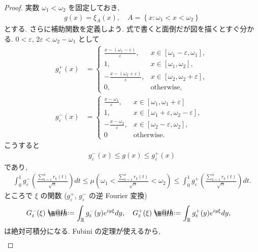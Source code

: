 \documentclass[openany, a4paper, oneside]{book}
\makeatletter
\newcommand*{\defeq}{\mathrel{\rlap{%
\raisebox{0.3ex}{$\m@th\cdot$}}%
\raisebox{-0.3ex}{$\m@th\cdot$}}%
=}
\theoremstyle{break}
\theoremstyle{breakdefn}
\newcommand{\rbk}[1]{\left (#1\right)}
\newcommand{\sqbk}[1]{\left[#1\right]}
\newcommand{\set}[2]{\left\{#1 : #2\right\}}
\newcommand{\bbR}{\mathbb{R}}
\newcommand{\gvarepsilonminus}{g_{\varepsilon}^{-}}
\newcommand{\gvarepsilonplus}{g_{\varepsilon}^{+}}
\makeatother
\begin{document}
\begin{proof}
実数 $\omega_1 < \omega_2$ を固定しておき,
\begin{align}
 g (x)
 =
 \xi_{A} (x), \quad A = \set{x}{\omega_1 < x < \omega_2}
\end{align}
とする.
さらに補助関数を定義しよう.
式で書くと面倒だが図を描くとすぐ分かる.
$0 < \varepsilon$, $2 \varepsilon < \omega_2 - \omega_1$ として
\begin{align}
 g_{\varepsilon}^{+}(x)
 &=
 \begin{cases}
  \frac{x - \rbk{\omega_1 - \varepsilon}}{\varepsilon}, & x \in \sqbk{\omega_1 - \varepsilon, \omega_1}, \\
  1, & x \in \sqbk{\omega_1, \omega_2}, \\
  -\frac{x - \rbk{\omega_2 + \varepsilon}}{\varepsilon}, & x \in \sqbk{\omega_2, \omega_2 + \varepsilon}, \\
  0, & \text{otherwise},
 \end{cases} \\
 g_{\varepsilon}^{-}(x)
 &=
 \begin{cases}
  \frac{x - \omega_1}{\varepsilon}, & x \in \sqbk{\omega_1, \omega_1 + \varepsilon} \\
  1, & x \in \sqbk{\omega_1 + \varepsilon, \omega_2 - \varepsilon}, \\
  -\frac{x - \omega_2}{\varepsilon}, & x \in \sqbk{\omega_2 - \varepsilon, \omega_2}, \\
  0 & \text{otherwise}.
 \end{cases}
\end{align}
こうすると
\begin{align}
 g_{\varepsilon}^{-} (x) \leq g (x) \leq g_{\varepsilon}^{+}(x)
\end{align}
であり,
\begin{align}
 \int_0^1 g_{\varepsilon}^{-} \rbk{\frac{\sum_{k=1}^{n} r_k (t)}{\sqrt{n}}} dt
 \leq
 \mu \rbk{\omega_1 < \frac{\sum_{k=1}^{n} r_k (t)}{\sqrt{n}} < \omega_2}
 \leq
 \int_0^1 g_{\varepsilon}^{+} \rbk{\frac{\sum_{k=1}^{n} r_k (t)}{\sqrt{n}}} dt.
\end{align}
ところで $\xi$ の関数 ($\gvarepsilonplus$, $\gvarepsilonminus$ の逆 Fourier 変換)
\begin{align}
 G_{\varepsilon}^{-} (\xi)
 \defeq
 \int_{\bbR} \gvarepsilonminus (y) e^{iy \xi} dy, \quad
 G_{\varepsilon}^{+} (\xi)
 \defeq
 \int_{\bbR} \gvarepsilonplus (y) e^{iy \xi} dy, \quad
\end{align}
は絶対可積分になる.
Fubini の定理が使えるから,
\begin{align}

\end{align}
\end{proof}
\end{document}
